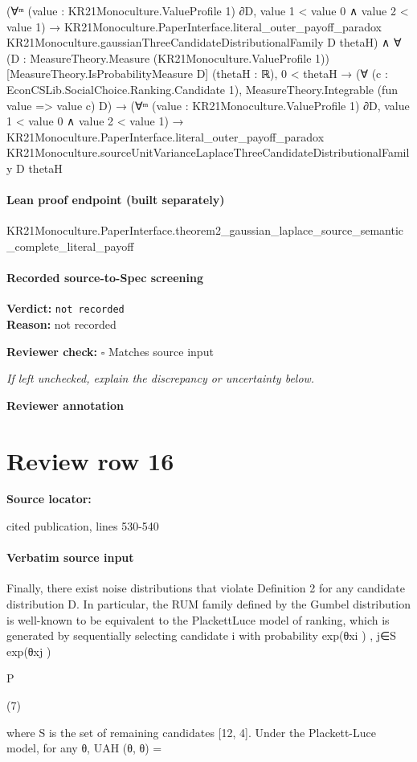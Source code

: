 \documentclass[10pt]{article}
\newcommand{\reviewerbox}{%
  \par\noindent\fbox{\parbox{0.96\linewidth}{\rule{0pt}{0.38in}}}\par
}
\newcommand{\reviewmatch}[1]{%
  \par\noindent\textbf{Reviewer check:} $\square$\; #1\par
  \noindent\emph{If left unchecked, explain the discrepancy or uncertainty below.}\par
}
\begin{document}
\begin{ReviewVerbatim}
                        (∀ᵐ (value : KR21Monoculture.ValueProfile 1) ∂D, value 1 < value 0 ∧ value 2 < value 1) →
                          KR21Monoculture.PaperInterface.literal_outer_payoff_paradox
                            KR21Monoculture.gaussianThreeCandidateDistributionalFamily D thetaH) ∧
                  ∀ (D : MeasureTheory.Measure (KR21Monoculture.ValueProfile 1)) [MeasureTheory.IsProbabilityMeasure D]
                    (thetaH : ℝ),
                    0 < thetaH →
                      (∀ (c : EconCSLib.SocialChoice.Ranking.Candidate 1),
                          MeasureTheory.Integrable (fun value => value c) D) →
                        (∀ᵐ (value : KR21Monoculture.ValueProfile 1) ∂D, value 1 < value 0 ∧ value 2 < value 1) →
                          KR21Monoculture.PaperInterface.literal_outer_payoff_paradox
                            KR21Monoculture.sourceUnitVarianceLaplaceThreeCandidateDistributionalFamily D thetaH
\end{ReviewVerbatim}

\paragraph{Lean proof endpoint (built separately)}\begin{ReviewVerbatim}
KR21Monoculture.PaperInterface.theorem2_gaussian_laplace_source_semantic_complete_literal_payoff
\end{ReviewVerbatim}

\paragraph{Recorded source-to-Spec screening}
\textbf{Verdict:} \texttt{not recorded}
\\
\textbf{Reason:} not recorded
\reviewmatch{Matches source input}
\noindent\textbf{Reviewer annotation}\par
\reviewerbox
\clearpage
\hypertarget{source-claim-8940f397fa4678ac}{}
\section*{Review row 16}
\textbf{Source locator:} {\footnotesize\raggedright cited publication, lines 530-\allowbreak{}540\par}
\paragraph{Verbatim source input}
\begin{ReviewVerbatim}
Finally, there exist noise distributions that violate Definition 2 for any candidate distribution D. In
particular, the RUM family defined by the Gumbel distribution is well-known to be equivalent to the PlackettLuce model of ranking, which is generated by sequentially selecting candidate i with probability
exp(θxi )
,
j∈S exp(θxj )

P

(7)

where S is the set of remaining candidates [12, 4]. Under the Plackett-Luce model, for any θ, UAH (θ, θ) =
\end{ReviewVerbatim}
\end{document}
